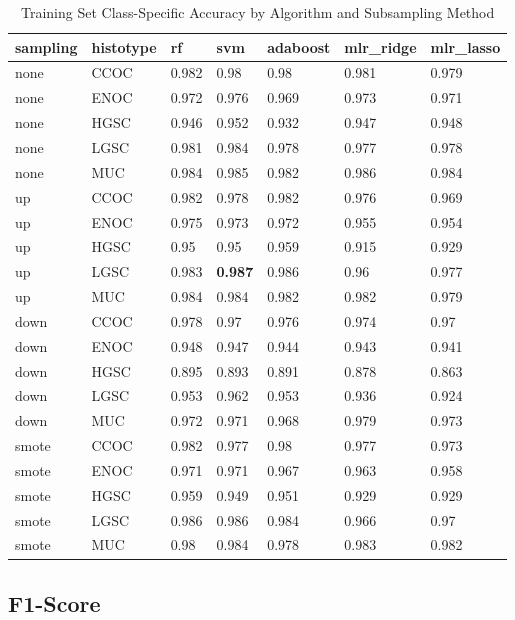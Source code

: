\documentclass[
]{report}
\begin{document}
\begin{table}

\caption{\label{tab:train-accuracy-class-table}Training Set Class-Specific Accuracy by Algorithm and Subsampling Method}
\centering
\begin{tabular}[t]{l|l|l|l|l|l|l}
\hline
sampling & histotype & rf & svm & adaboost & mlr\_ridge & mlr\_lasso\\
\hline
none & CCOC & 0.982 & 0.98 & 0.98 & 0.981 & 0.979\\
\hline
none & ENOC & 0.972 & 0.976 & 0.969 & 0.973 & 0.971\\
\hline
none & HGSC & 0.946 & 0.952 & 0.932 & 0.947 & 0.948\\
\hline
none & LGSC & 0.981 & 0.984 & 0.978 & 0.977 & 0.978\\
\hline
none & MUC & 0.984 & 0.985 & 0.982 & 0.986 & 0.984\\
\hline
up & CCOC & 0.982 & 0.978 & 0.982 & 0.976 & 0.969\\
\hline
up & ENOC & 0.975 & 0.973 & 0.972 & 0.955 & 0.954\\
\hline
up & HGSC & 0.95 & 0.95 & 0.959 & 0.915 & 0.929\\
\hline
up & LGSC & 0.983 & \textbf{0.987} & 0.986 & 0.96 & 0.977\\
\hline
up & MUC & 0.984 & 0.984 & 0.982 & 0.982 & 0.979\\
\hline
down & CCOC & 0.978 & 0.97 & 0.976 & 0.974 & 0.97\\
\hline
down & ENOC & 0.948 & 0.947 & 0.944 & 0.943 & 0.941\\
\hline
down & HGSC & 0.895 & 0.893 & 0.891 & 0.878 & 0.863\\
\hline
down & LGSC & 0.953 & 0.962 & 0.953 & 0.936 & 0.924\\
\hline
down & MUC & 0.972 & 0.971 & 0.968 & 0.979 & 0.973\\
\hline
smote & CCOC & 0.982 & 0.977 & 0.98 & 0.977 & 0.973\\
\hline
smote & ENOC & 0.971 & 0.971 & 0.967 & 0.963 & 0.958\\
\hline
smote & HGSC & 0.959 & 0.949 & 0.951 & 0.929 & 0.929\\
\hline
smote & LGSC & 0.986 & 0.986 & 0.984 & 0.966 & 0.97\\
\hline
smote & MUC & 0.98 & 0.984 & 0.978 & 0.983 & 0.982\\
\hline
\end{tabular}
\end{table}

\hypertarget{f1-score}{%
\subsection{F1-Score}\label{f1-score}}
\end{document}
